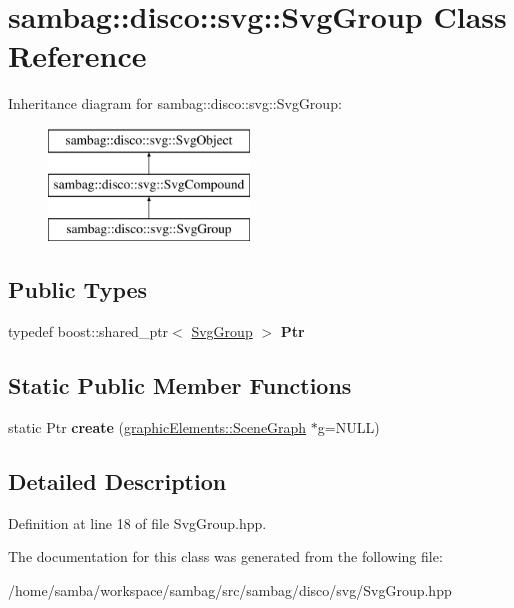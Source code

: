 \hypertarget{classsambag_1_1disco_1_1svg_1_1_svg_group}{
\section{sambag::disco::svg::SvgGroup Class Reference}
\label{classsambag_1_1disco_1_1svg_1_1_svg_group}
}
Inheritance diagram for sambag::disco::svg::SvgGroup:\begin{figure}[H]
\begin{center}
\leavevmode
\includegraphics[height=3.000000cm]{classsambag_1_1disco_1_1svg_1_1_svg_group}
\end{center}
\end{figure}
\subsection*{Public Types}
\begin{DoxyCompactItemize}
\item 
\hypertarget{classsambag_1_1disco_1_1svg_1_1_svg_group_a151838b5d1420428d57e8da808daf019}{
typedef boost::shared\_\-ptr$<$ \hyperlink{classsambag_1_1disco_1_1svg_1_1_svg_group}{SvgGroup} $>$ {\bfseries Ptr}}
\label{classsambag_1_1disco_1_1svg_1_1_svg_group_a151838b5d1420428d57e8da808daf019}

\end{DoxyCompactItemize}
\subsection*{Static Public Member Functions}
\begin{DoxyCompactItemize}
\item 
\hypertarget{classsambag_1_1disco_1_1svg_1_1_svg_group_a5d5dd38525cb43b90caf05973ec6795b}{
static Ptr {\bfseries create} (\hyperlink{classsambag_1_1disco_1_1graphic_elements_1_1_scene_graph}{graphicElements::SceneGraph} $\ast$g=NULL)}
\label{classsambag_1_1disco_1_1svg_1_1_svg_group_a5d5dd38525cb43b90caf05973ec6795b}

\end{DoxyCompactItemize}


\subsection{Detailed Description}


Definition at line 18 of file SvgGroup.hpp.



The documentation for this class was generated from the following file:\begin{DoxyCompactItemize}
\item 
/home/samba/workspace/sambag/src/sambag/disco/svg/SvgGroup.hpp\end{DoxyCompactItemize}
